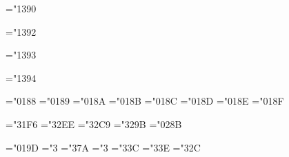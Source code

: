 
\mathchardef\surfintop="1390 
\def\surfint{\surfintop\nolimits}


\mathchardef\midintop="1392 
\def\midint{\midintop\nolimits}

\mathchardef\midointop="1393 
\def\midoint{\midointop\nolimits}

\mathchardef\midsurfintop="1394 
\def\midsurfint{\midsurfintop\nolimits}


\def\largeint{\delimiter"135A395}


\mathchardef\dblint  ="0188
\mathchardef\trplint ="0189
\mathchardef\contint ="018A
\mathchardef\surfint ="018B
\mathchardef\volint  ="018C
\mathchardef\clwint  ="018D
\mathchardef\cclwcint="018E
\mathchardef\clwcint ="018F


\def\joinrel{\mathrel{\mkern-4mu}} 


\mathchardef\bowtie="31F6
\mathchardef\models="32EE
\mathchardef\doteq ="32C9
\mathchardef\cong  ="329B
\mathchardef\angle ="028B



\mathchardef\hbar             ="019D
\mathchardef\neq              ="3
\mathchardef\rightleftharpoons="3\thearfam 7A
\mathchardef\leftrightharpoons="3
\mathchardef\hookleftarrow    ="3\thearfam 3C
\mathchardef\hookrightarrow   ="3\thearfam 3E
\mathchardef\mapsto           ="3\thearfam 2C



\def\mathstrut{\vphantom{f}}


